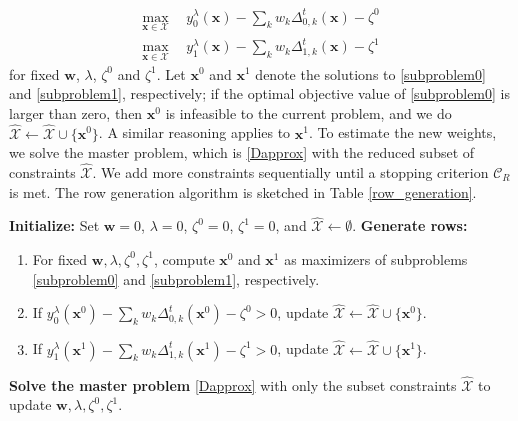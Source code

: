 \documentclass[12pt,a4paper]{article}
\newcommand{\bx}{\mathbf{x}}
\newcommand{\bw}{\mathbf{w}}
\newcommand{\mX}{\mathcal{X}}
\begin{document}
		\begin{align}
			\max_{\bx \in \mX}  &\  \ y_0^\lambda(\bx) -\sum_k w_k \Delta_{0,k}^t(\bx) -  \zeta^0 \label{subproblem0} \\
			\max_{\bx \in \mX}  &\  \ y_1^\lambda(\bx) -\sum_k w_k \Delta_{1,k}^t(\bx) -  \zeta^1 \label{subproblem1} 
		\end{align}
\noindent for fixed $\bw$, $\lambda$, $\zeta^0$ and $\zeta^1$.
		Let $\bx^0$ and $\bx^1$ denote the solutions to \eqref{subproblem0} and \eqref{subproblem1}, respectively; if the optimal objective value of \eqref{subproblem0} is larger than zero, then $\bx^0$ is infeasible to the current problem, and we do $\hat{\mX} \leftarrow \hat{\mX} \cup \{\bx^0\}$. A similar reasoning applies to $\bx^1$. To estimate the new weights, we solve the master problem, which is \eqref{Dapprox} with the reduced subset of constraints $\hat{\mX}$. We add more constraints sequentially until a stopping criterion $\mathcal{C}_R$ is met. The row generation algorithm is sketched in Table \ref{row_generation}.




\begin{algorithm}[H]
\caption{Row Generation Algorithm}
\label{row_generation}
\begin{algorithmic}[1]
\STATE \textbf{Initialize:} Set \( \bw = 0 \), \( \lambda = 0 \), \( \zeta^0 = 0 \), \( \zeta^1 = 0 \), and \( \hat{\mathcal{X}} \leftarrow \emptyset \).
    \STATE \textbf{Generate rows:}
    \begin{enumerate}
        \item[(a)] For fixed \( \bw, \lambda, \zeta^0, \zeta^1 \), compute \( \bx^0 \) and \( \bx^1 \) as maximizers of subproblems \eqref{subproblem0} and \eqref{subproblem1}, respectively.
        \item[(b)] If \( y_0^\lambda(\bx^0) - \sum_k w_k \Delta_{0,k}^t(\bx^0) - \zeta^0 > 0 \), update \( \hat{\mathcal{X}} \leftarrow \hat{\mathcal{X}} \cup \{ \bx^0 \} \).
        \item[(c)] If \( y_1^\lambda(\bx^1) - \sum_k w_k \Delta_{1,k}^t(\bx^1) - \zeta^1 > 0 \), update \( \hat{\mathcal{X}} \leftarrow \hat{\mathcal{X}} \cup \{ \bx^1 \} \).
    \end{enumerate}
    \STATE \textbf{Solve the master problem} \eqref{Dapprox} with only the subset constraints \( \hat{\mathcal{X}} \) to update \( \bw, \lambda, \zeta^0, \zeta^1 \).
\ENDWHILE
\end{algorithmic}
\end{algorithm}
\end{document}
